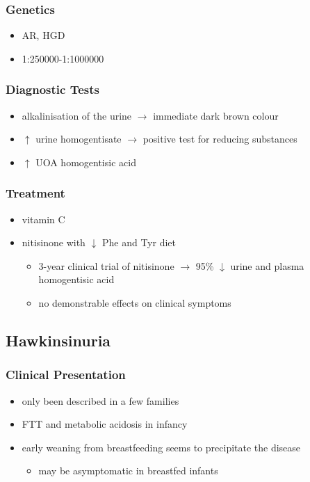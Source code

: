 \documentclass{scrartcl}
\begin{document}
\subsubsection{Genetics}
\label{sec:org863d058}
\begin{itemize}
\item AR, HGD
\item 1:250000-1:1000000
\end{itemize}
\subsubsection{Diagnostic Tests}
\label{sec:org06631fe}
\begin{itemize}
\item alkalinisation of the urine \(\to\) immediate dark brown colour
\item \(\uparrow\) urine homogentisate \(\to\) positive test for reducing substances
\item \(\uparrow\) UOA homogentisic acid
\end{itemize}
\subsubsection{Treatment}
\label{sec:org5b803e0}
\begin{itemize}
\item vitamin C
\item nitisinone with \(\downarrow\) Phe and Tyr diet
\begin{itemize}
\item 3-year clinical trial of nitisinone \(\to\) 95\% \(\downarrow\) urine and plasma homogentisic acid
\item no demonstrable effects on clinical symptoms
\end{itemize}
\end{itemize}

\subsection{Hawkinsinuria}
\label{sec:orgc282f8c}
\subsubsection{Clinical Presentation}
\label{sec:org149e207}
\begin{itemize}
\item only been described in a few families
\item FTT and metabolic acidosis in infancy
\item early weaning from breastfeeding seems to precipitate the disease
\begin{itemize}
\item may be asymptomatic in breastfed infants
\end{itemize}
\end{itemize}
\end{document}
